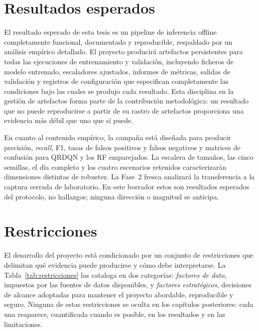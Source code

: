 \section{Resultados esperados}
El resultado esperado de esta tesis es un pipeline de inferencia offline completamente funcional, documentado y reproducible, respaldado por un análisis empírico detallado. El proyecto producirá artefactos persistentes para todas las ejecuciones de entrenamiento y validación, incluyendo ficheros de modelo entrenado, escaladores ajustados, informes de métricas, salidas de validación y registros de configuración que especifican completamente las condiciones bajo las cuales se produjo cada resultado. Esta disciplina en la gestión de artefactos forma parte de la contribución metodológica: un resultado que no puede reproducirse a partir de su rastro de artefactos proporciona una evidencia más débil que uno que sí puede.

En cuanto al contenido empírico, la campaña está diseñada para producir precisión, \emph{recall}, F1, tasas de falsos positivos y falsos negativos y matrices de confusión para QRDQN y los RF emparejados. La escalera de tamaños, las cinco semillas, el día completo y los cuatro escenarios retenidos caracterizarán dimensiones distintas de robustez. La Fase~2 fresca analizará la transferencia a la captura cerrada de laboratorio. En este borrador estos son resultados esperados del protocolo, no hallazgos; ninguna dirección o magnitud se anticipa.

\section{Restricciones}
El desarrollo del proyecto está condicionado por un conjunto de restricciones que delimitan qué evidencia puede producirse y cómo debe interpretarse. La Tabla~\ref{tab:restricciones} las cataloga en dos categorías: \emph{factores de dato}, impuestos por las fuentes de datos disponibles, y \emph{factores estratégicos}, decisiones de alcance adoptadas para mantener el proyecto abordable, reproducible y seguro. Ninguna de estas restricciones se oculta en los capítulos posteriores: cada una reaparece, cuantificada cuando es posible, en los resultados y en las limitaciones.

